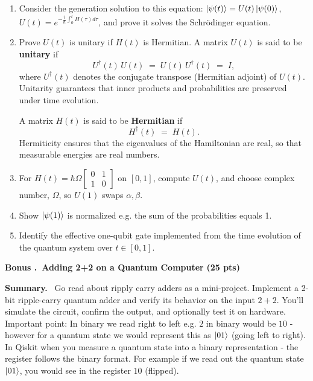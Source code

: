\documentclass[11pt]{article}
\newcommand{\pts}[1]{\hfill{\small\bfseries(#1 pts)}}
\newenvironment{summary}{\vspace{2pt}\noindent\textbf{Summary.}~}{\par\vspace{6pt}}
\newcounter{bonus}
\newcommand{\bonus}[2]{%
  \refstepcounter{bonus}
  \vspace{10pt}\noindent\textbf{Bonus \Alph{bonus}.~#1} \pts{#2}\par
}
\begin{document}
\begin{enumerate}[label=(\alph*)]
  \item Consider the generation solution to this equation: $\ket{\psi(t)}=U(t)\ket{\psi(0)}$, $U(t)=e^{-\tfrac{i}{\hbar}\int_0^t H(\tau)d\tau}$, and prove it solves the Schr\"odinger equation.
  \item Prove $U(t)$ is unitary if $H(t)$ is Hermitian. A matrix $U(t)$ is said to be \textbf{unitary} if 
\[
U^\dagger(t)\,U(t) \;=\; U(t)\,U^\dagger(t) \;=\; I,
\]
where $U^\dagger(t)$ denotes the conjugate transpose (Hermitian adjoint) of $U(t)$.  
Unitarity guarantees that inner products and probabilities are preserved under time evolution.

A matrix $H(t)$ is said to be \textbf{Hermitian} if 
\[
H^\dagger(t) \;=\; H(t).
\]
Hermiticity ensures that the eigenvalues of the Hamiltonian are real, so that measurable energies are real numbers.
  \item For $H(t)=\hbar\Omega \begin{bmatrix}
0 & 1 \\
1 & 0
\end{bmatrix}$ on $[0,1]$, compute $U(t)$, and choose complex number, $\Omega$,  so $U(1)$ swaps $\alpha,\beta$.
  \item Show $\ket{\psi(1)}$ is normalized e.g. the sum of the probabilities equals 1.
  \item Identify the effective one-qubit gate implemented from the time evolution of the quantum system over $t\in[0,1]$. 
\end{enumerate}

\bonus{Adding 2+2 on a Quantum Computer}{25}
\begin{summary}
Go read about ripply carry adders as a mini-project. Implement a 2-bit ripple-carry quantum adder and verify its behavior on the input $2+2$. You’ll simulate the circuit, confirm the output, and optionally test it on hardware. Important point: In binary we read right to left e.g. $2$ in binary would be $10$ - however for a quantum state we would represent this as $\ket{01}$ (going left to right). In Qiskit when you measure a quantum state into a binary representation - the register follows the binary format. For example if we read out the quantum state $\ket{01}$, you would see in the register $10$ (flipped).
\end{summary}
\end{document}
